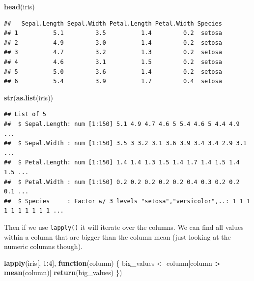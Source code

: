 \documentclass[
]{book}
\newenvironment{Shaded}{\begin{snugshade}}{\end{snugshade}}
\newcommand{\ControlFlowTok}[1]{\textcolor[rgb]{0.13,0.29,0.53}{\textbf{#1}}}
\newcommand{\DecValTok}[1]{\textcolor[rgb]{0.00,0.00,0.81}{#1}}
\newcommand{\KeywordTok}[1]{\textcolor[rgb]{0.13,0.29,0.53}{\textbf{#1}}}
\newcommand{\NormalTok}[1]{#1}
\newcommand{\OperatorTok}[1]{\textcolor[rgb]{0.81,0.36,0.00}{\textbf{#1}}}
\newcommand{\StringTok}[1]{\textcolor[rgb]{0.31,0.60,0.02}{#1}}
\begin{document}
\begin{Shaded}
\begin{Highlighting}[]
\KeywordTok{head}\NormalTok{(iris)}
\end{Highlighting}
\end{Shaded}

\begin{verbatim}
##   Sepal.Length Sepal.Width Petal.Length Petal.Width Species
## 1          5.1         3.5          1.4         0.2  setosa
## 2          4.9         3.0          1.4         0.2  setosa
## 3          4.7         3.2          1.3         0.2  setosa
## 4          4.6         3.1          1.5         0.2  setosa
## 5          5.0         3.6          1.4         0.2  setosa
## 6          5.4         3.9          1.7         0.4  setosa
\end{verbatim}

\begin{Shaded}
\begin{Highlighting}[]
\KeywordTok{str}\NormalTok{(}\KeywordTok{as.list}\NormalTok{(iris))}
\end{Highlighting}
\end{Shaded}

\begin{verbatim}
## List of 5
##  $ Sepal.Length: num [1:150] 5.1 4.9 4.7 4.6 5 5.4 4.6 5 4.4 4.9 ...
##  $ Sepal.Width : num [1:150] 3.5 3 3.2 3.1 3.6 3.9 3.4 3.4 2.9 3.1 ...
##  $ Petal.Length: num [1:150] 1.4 1.4 1.3 1.5 1.4 1.7 1.4 1.5 1.4 1.5 ...
##  $ Petal.Width : num [1:150] 0.2 0.2 0.2 0.2 0.2 0.4 0.3 0.2 0.2 0.1 ...
##  $ Species     : Factor w/ 3 levels "setosa","versicolor",..: 1 1 1 1 1 1 1 1 1 1 ...
\end{verbatim}

Then if we use \texttt{lapply()} it will iterate over the columns. We can find all values within a column that are bigger than the column mean (just looking at the numeric columns though).

\begin{Shaded}
\begin{Highlighting}[]
\KeywordTok{lapply}\NormalTok{(iris[, }\DecValTok{1}\OperatorTok{:}\DecValTok{4}\NormalTok{], }\ControlFlowTok{function}\NormalTok{(column) \{}
\NormalTok{    big_values <-}\StringTok{ }\NormalTok{column[column }\OperatorTok{>}\StringTok{ }\KeywordTok{mean}\NormalTok{(column)]}
    \KeywordTok{return}\NormalTok{(big_values)}
\NormalTok{\})}
\end{Highlighting}
\end{Shaded}
\end{document}
